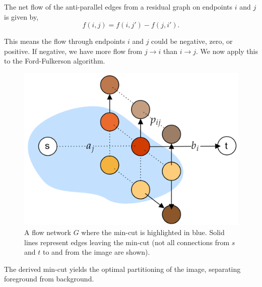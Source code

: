 \vspace{-1em}
\begin{Def}

    The net flow of the anti-parallel edges from a residual graph on endpoints $i$ and $j$ is given by,
    $$f(i,j) = f(i,j') - f(j,i').$$
\end{Def}
\noindent
This means the flow through endpoints $i$ and $j$ could be negative, zero, or positive. If negative, we have more flow from $j\to i$ than $i\to j$.
We now apply this to the Ford-Fulkerson algorithm.
\vspace{-1em}
\begin{figure}[h]
    \centering
    \includegraphics[width=.5\textwidth]{Sections/net/img.png}
    \caption{A flow network $G$ where the min-cut is highlighted in blue. Solid lines represent edges leaving the min-cut
    (not all connections from $s$ and $t$ to and from the image are shown).}
\end{figure}

\noindent
The derived min-cut yields the optimal partitioning of the image, separating foreground from background.





